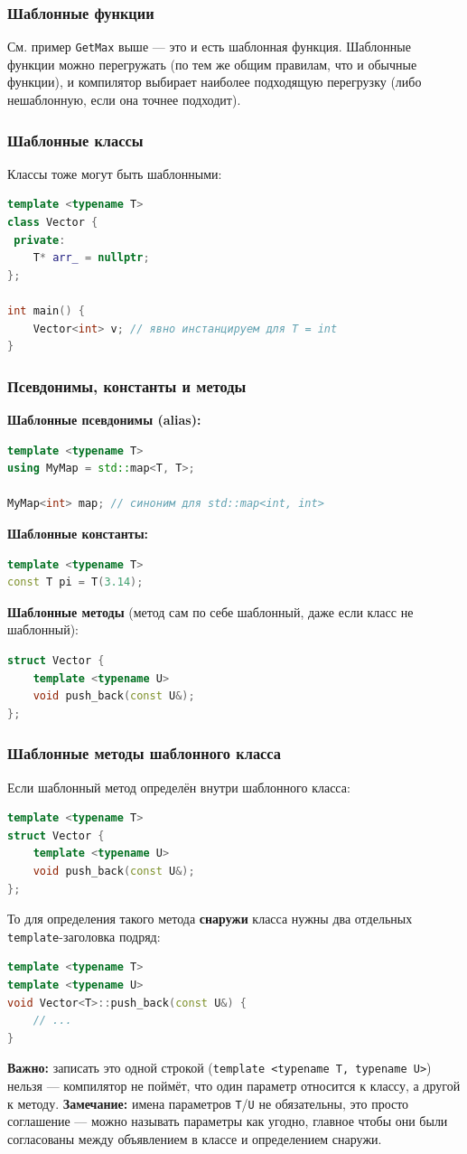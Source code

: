\subsubsection{Шаблонные функции}
См. пример \texttt{GetMax} выше --- это и есть шаблонная функция. Шаблонные функции можно перегружать (по тем же общим правилам, что и обычные функции), и компилятор выбирает наиболее подходящую перегрузку (либо нешаблонную, если она точнее подходит).
\subsubsection{Шаблонные классы}
Классы тоже могут быть шаблонными:
\begin{lstlisting}[language=C++]
template <typename T>
class Vector {
 private:
    T* arr_ = nullptr;
};

int main() {
    Vector<int> v; // явно инстанцируем для T = int
}
\end{lstlisting}
\subsubsection{Псевдонимы, константы и методы}
\textbf{Шаблонные псевдонимы (alias):}
\begin{lstlisting}[language=C++]
template <typename T>
using MyMap = std::map<T, T>;

MyMap<int> map; // синоним для std::map<int, int>
\end{lstlisting}
\textbf{Шаблонные константы:}
\begin{lstlisting}[language=C++]
template <typename T>
const T pi = T(3.14);
\end{lstlisting}
\textbf{Шаблонные методы} (метод сам по себе шаблонный, даже если класс не шаблонный):
\begin{lstlisting}[language=C++]
struct Vector {
    template <typename U>
    void push_back(const U&);
};
\end{lstlisting}
\subsubsection{Шаблонные методы шаблонного класса}
Если шаблонный метод определён внутри шаблонного класса:
\begin{lstlisting}[language=C++]
template <typename T>
struct Vector {
    template <typename U>
    void push_back(const U&);
};
\end{lstlisting}
То для определения такого метода \textbf{снаружи} класса нужны два отдельных \texttt{template}-заголовка подряд:
\begin{lstlisting}[language=C++]
template <typename T>
template <typename U>
void Vector<T>::push_back(const U&) {
    // ...
}
\end{lstlisting}
\textbf{Важно:} записать это одной строкой (\texttt{template <typename T, typename U>}) нельзя --- компилятор не поймёт, что один параметр относится к классу, а другой к методу.
\textbf{Замечание:} имена параметров \texttt{T}/\texttt{U} не обязательны, это просто соглашение --- можно называть параметры как угодно, главное чтобы они были согласованы между объявлением в классе и определением снаружи.
